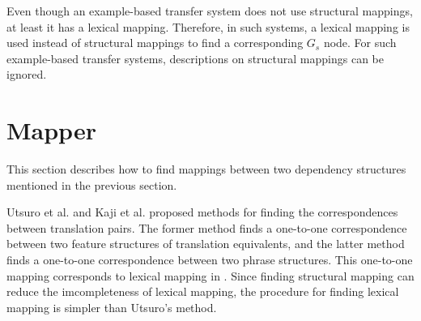 Even though an example-based transfer system does not use structural mappings,
at least it has a lexical mapping. Therefore, in such systems, a lexical
mapping is used instead of structural mappings to find a corresponding $G_s$
node. For such example-based transfer systems, descriptions on structural
mappings can be ignored.

\section{Mapper}
\label{sec:mapping} 

This section describes how to find mappings between two dependency structures
mentioned in the previous section.

Utsuro et al. \cite{utsuro92} and Kaji et al. \cite{kaji92} proposed methods
for finding the correspondences between translation pairs.  The former method
finds a one-to-one correspondence between two feature structures of
translation equivalents, and the latter method finds a one-to-one
correspondence between two phrase structures. This one-to-one mapping
corresponds to lexical mapping in \SimTran. Since finding structural mapping
can reduce the imcompleteness of lexical mapping, the procedure for finding
lexical mapping is simpler than Utsuro's method.

